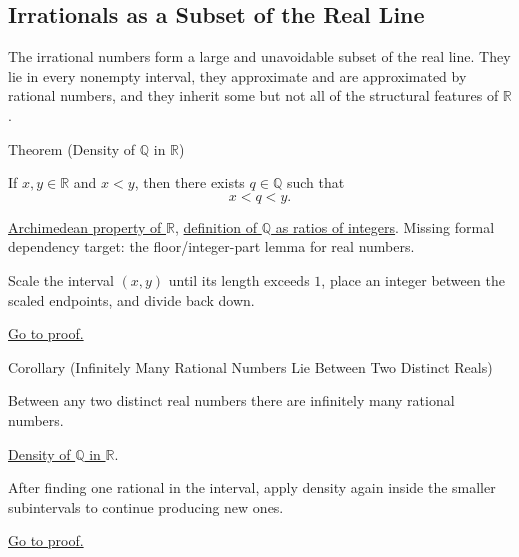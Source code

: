 
\subsection{Irrationals as a Subset of the Real Line}
\label{sec:irrationals-as-a-subset}

\begin{exposition}
The irrational numbers form a large and unavoidable subset of the real line.
They lie in every nonempty interval, they approximate and are approximated by
rational numbers, and they inherit some but not all of the structural features
of $\mathbb{R}$.
\end{exposition}

\begin{theorembox}{Theorem (Density of $\mathbb{Q}$ in $\mathbb{R}$)}
\begin{theorem}
\label{thm:q-dense-in-r}
If $x,y\in\mathbb{R}$ and $x<y$, then there exists $q\in\mathbb{Q}$ such that
\[
x<q<y.
\]
\end{theorem}
\end{theorembox}
\begin{dependencies}
\hyperref[thm:archimedean-property]{Archimedean property of $\mathbb{R}$},
\hyperref[def:rationals]{definition of $\mathbb{Q}$ as ratios of integers}.
Missing formal dependency target: the floor/integer-part lemma for real numbers.
\end{dependencies}
\begin{remark*}
Scale the interval $(x,y)$ until its length exceeds $1$, place an integer
between the scaled endpoints, and divide back down.
\end{remark*}
\begin{remark*}[Proof]
\hyperref[prf:q-dense-in-r]{Go to proof.}
\end{remark*}

\begin{corollarybox}{Corollary (Infinitely Many Rational Numbers Lie Between Two Distinct Reals)}
\begin{corollary}
\label{cor:infinitely-many-rationals-between}
Between any two distinct real numbers there are infinitely many rational numbers.
\end{corollary}
\end{corollarybox}
\begin{dependencies}
\hyperref[thm:q-dense-in-r]{Density of $\mathbb{Q}$ in $\mathbb{R}$}.
\end{dependencies}
\begin{remark*}
After finding one rational in the interval, apply density again inside the
smaller subintervals to continue producing new ones.
\end{remark*}
\begin{remark*}[Proof]
\hyperref[prf:infinitely-many-rationals-between]{Go to proof.}
\end{remark*}

